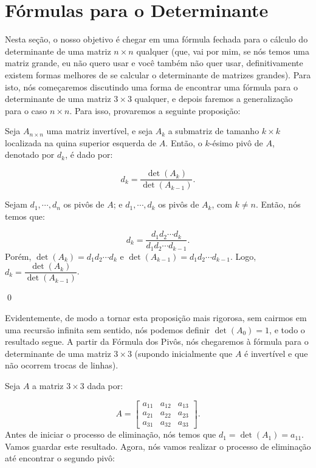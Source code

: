 \section{Fórmulas para o Determinante}

Nesta seção, o nosso objetivo é chegar em uma fórmula fechada para o cálculo do determinante de uma matriz $n\times n$ qualquer (que, vai por mim, se nós temos uma matriz grande, eu não quero usar e você também não quer usar, definitivamente existem formas melhores de se calcular o determinante de matrizes grandes). Para isto, nós começaremos discutindo uma forma de encontrar uma fórmula para o determinante de uma matriz $3\times 3$ qualquer, e depois faremos a generalização para o caso $n\times n$. Para isso, provaremos a seguinte proposição:

\begin{Proposition}
	Seja $A_{n\times n}$ uma matriz invertível, e seja $A_k$ a submatriz de tamanho $k\times k$ localizada na quina superior esquerda de $A$. Então, o $k$-ésimo pivô de $A$, denotado por $d_k$, é dado por:
	
	$$
	d_k = \dfrac{\det(A_k)}{\det(A_{k - 1})}.
	$$
\end{Proposition}

\begin{Proof}
	Sejam $d_1, \cdots, d_n$ os pivôs de $A$; e $d_1, \cdots, d_k$ os pivôs de $A_k$, com $k\neq n$. Então, nós temos que:
	
	$$
	d_k = \dfrac{d_1d_2\cdots d_k}{d_1d_2\cdots d_{k - 1}}.
	$$
	Porém, $\det(A_k) = d_1d_2\cdots d_k$ e $\det(A_{k - 1}) = d_1d_2\cdots d_{k - 1}$. Logo, $d_k = \dfrac{\det(A_k)}{\det(A_{k - 1})}$.
	
	\qed
\end{Proof}

Evidentemente, de modo a tornar esta proposição mais rigorosa, sem cairmos em uma recursão infinita sem sentido, nós podemos definir $\det(A_0) = 1$, e todo o resultado segue. A partir da Fórmula dos Pivôs, nós chegaremos à fórmula para o determinante de uma matriz $3\times 3$ (supondo inicialmente que $A$ é invertível e que não ocorrem trocas de linhas).

Seja $A$ a matriz $3\times 3$ dada por:

$$
A = \begin{bmatrix}
	a_{11} & a_{12} & a_{13} \\
	a_{21} & a_{22} & a_{23} \\
	a_{31} & a_{32} & a_{33}
\end{bmatrix}.
$$
Antes de iniciar o processo de eliminação, nós temos que $d_1 = \det(A_1) = a_11$. Vamos guardar este resultado. Agora, nós vamos realizar o processo de eliminação até encontrar o segundo pivô:

